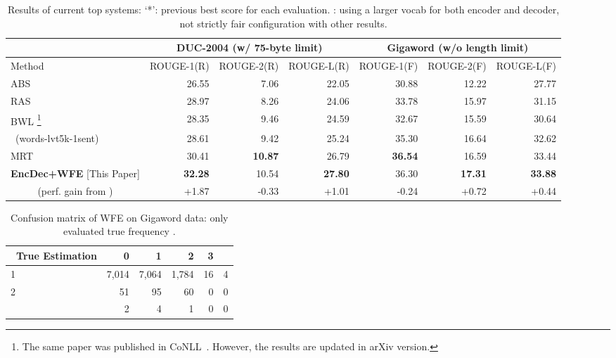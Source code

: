 \documentclass[11pt]{article}
\begin{document}
\begin{table*}[t]
 \small
 \centering
 \tabcolsep=2pt
 \begin{tabular}{l | r | r | r || r | r| r}
  \hline
   \             & \multicolumn{3}{c||}{DUC-2004 (w/ 75-byte limit)}
                  & \multicolumn{3}{c}{Gigaword (w/o length limit)}\\
  \hline
  Method & ROUGE-1(R) & ROUGE-2(R) & ROUGE-L(R) & ROUGE-1(F) & ROUGE-2(F) & ROUGE-L(F)\\
  \hline
  ABS \cite{rush-chopra-weston:2015:EMNLP}
                       & 26.55  & 7.06  & 22.05 & 30.88 & 12.22 & 27.77\\
  \hline
  RAS \cite{chopra-auli-rush:2016:N16-1}&
      28.97  & 8.26  & 24.06 & 33.78  & 15.97 & 31.15\\
  \hline
  BWL \cite{DBLP:journals/corr/NallapatiXZ16}\footnote{The same paper was published in CoNLL~\cite{nallapati-EtAl:2016:CoNLL}. However, the results are updated in arXiv version.}&
      28.35  & 9.46  & 24.59 & 32.67  & 15.59 & 30.64\\
  \,\,\,(words-lvt5k-1sent)  &
      28.61  & 9.42  &25.24  &35.30   &16.64 & 32.62 \\
  \hline
MRT \cite{DBLP:journals/corr/AyanaSLS16}&
      30.41  & \bf 10.87  & 26.79 & \bf 36.54  & 16.59 & 33.44\\
  \hline
{\bf EncDec+WFE} [This Paper] &\bf  32.28  & 10.54  &\bf 27.80
                                   & 36.30 &\bf 17.31  &\bf 33.88 \\
  \hline
   \hline
   \multicolumn{1}{c|}{ (perf. gain from )}
                              &      +1.87 &  -0.33 &   +1.01           &   -0.24 &  +0.72 &   +0.44 \\
   \hline
 \end{tabular}
 \caption{Results of current top systems: `*': previous best score for each evaluation. : using a larger vocab for both encoder and decoder, not strictly fair configuration with other results.}
 \label{table:topsystem}
\end{table*}
\begin{table}[t]
 \small
 \centering
 \tabcolsep=2pt
 \begin{tabular}{ l || r | r |r |r|r   }
  \hline 
  \  True   Estimation   &   0  & 1 &   2  & 3 &   \\
  \hline 
  1              &  7,014  & 7,064     &  1,784  & 16  & 4  \\
  \hline 
  2              &  51     &    95     &   60    & 0 & 0  \\
  \hline 
         &   2    &  4      &   1     & 0 & 0  \\
  \hline 
 \end{tabular}
 \caption{Confusion matrix of WFE on Gigaword data: only evaluated true frequency .}
 \label{table:result_wordset}
\end{table}
\end{document}
